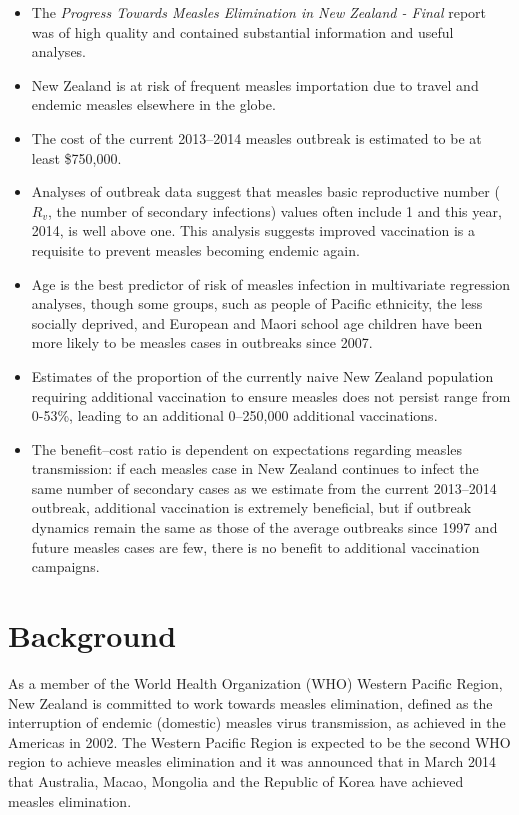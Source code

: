 \documentclass{article}
\begin{document}
\begin{itemize}
\item The \emph {Progress Towards Measles Elimination in New Zealand - Final} report was of high quality and contained substantial information and useful analyses.
\item New Zealand is at risk of frequent measles importation due to travel and endemic measles elsewhere in the globe.
\item The cost of the current 2013--2014 measles outbreak is estimated to be at least \$750,000.
\item Analyses of outbreak data suggest that measles basic reproductive number ($R_v$, the number of secondary infections) values often include 1 and this year, 2014, is well above one. This analysis suggests improved vaccination is a requisite to prevent measles becoming endemic again.
\item Age is the best predictor of risk of measles infection in multivariate regression analyses, though some groups, such as people of Pacific ethnicity, the less socially deprived, and European and Maori school age children have been more likely to be measles cases in outbreaks since 2007.
\item Estimates of the proportion of the currently naive New Zealand population requiring additional vaccination to ensure measles does not persist range from 0-53\%, leading to an additional 0--250,000 additional vaccinations.
\item The benefit--cost ratio is dependent on expectations regarding measles transmission: if each measles case in New Zealand continues to infect the same number of secondary cases as we estimate from the current 2013--2014 outbreak, additional vaccination is extremely beneficial, but if outbreak dynamics remain the same as those of the average outbreaks since 1997 and future measles cases are few, there is no benefit to additional vaccination campaigns.
\end{itemize}

\section{Background}

As a member of the World Health Organization (WHO) Western Pacific Region, New Zealand is committed to work towards measles elimination, defined as the interruption of endemic (domestic) measles virus transmission, as achieved in the Americas in 2002. The Western Pacific Region is expected to be the second WHO region to  achieve measles elimination and it was announced that in March 2014 that Australia, Macao, Mongolia and the Republic of Korea have achieved measles elimination.
\end{document}
